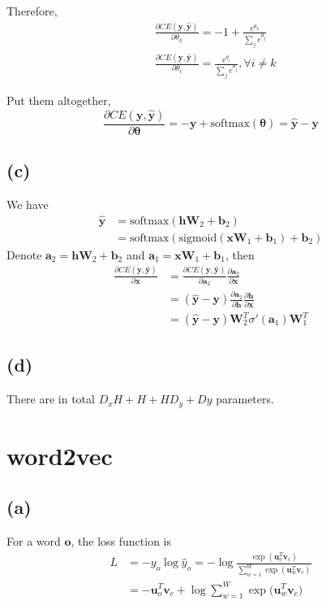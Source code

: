 \documentclass[12pt]{article}
\begin{document}
Therefore, 
\begin{align*}
&\frac{\partial CE(\bm y, \bm {\hat y})} {\partial \theta_k} = -1 + \frac{e^{\theta_k}}{\sum_j e^{\theta_j}}  \\
&\frac{\partial CE(\bm y, \bm {\hat y})} {\partial \theta_i} =  \frac{e^{\theta_i}}{\sum_j e^{\theta_j}}, \forall i \neq k
\end{align*}

Put them altogether,
$$
\frac{\partial CE(\bm y, \bm {\hat y})} {\partial \bm \theta} = -\bm y + \text{softmax}(\bm {\theta}) = \bm {\hat y} - \bm y
$$

\subsection*{(c)}
We have 
\begin{align*}
\bm {\hat y} &= \text{softmax}(\bm h \bm W_2 + \bm b_2) \\
	           &= \text{softmax} \left ( \text{sigmoid} (\bm x \bm W_1 + \bm b_1)  + \bm b_2\right)
\end{align*}
Denote $\bm a_2 = \bm h \bm W_2 + \bm b_2$ and $\bm a_1 = \bm x \bm W_1 + \bm b_1$, then 
\begin{align*}
\frac{\partial CE(\bm y, \bm {\hat y})} {\partial \bm x} &=  \frac{\partial CE(\bm y, \bm {\hat y})}{\partial \bm a_2} \frac{\partial \bm a_2}{\partial \bm x} \\
&=  (\bm {\hat y} - \bm y) \frac{\partial \bm a_2}{\partial \bm h} \frac{\partial \bm h} {\partial \bm x} \\
&= (\bm {\hat y} - \bm y) \bm W_2^T \sigma'(\bm a_1) \bm W_1^T
\end{align*}

\subsection*{(d)}

There are in total $D_x H + H +H D_y+Dy$ parameters.


\section{word2vec}

\subsection*{(a)}	
For a word $\bm o$, the loss function is
\begin{align*}
L &= -y_o \log {\hat y_o} = -\log {\frac{\exp(\bm u_o^T \bm v_c)} {\sum_{w=1}^W \exp(\bm u_w^T \bm v_c)}} \\
   &= -\bm u_o^T \bm v_c + \log{\sum_{w=1}^W \exp(\bm u_w^T \bm v_c})
\end{align*}
\end{document}
